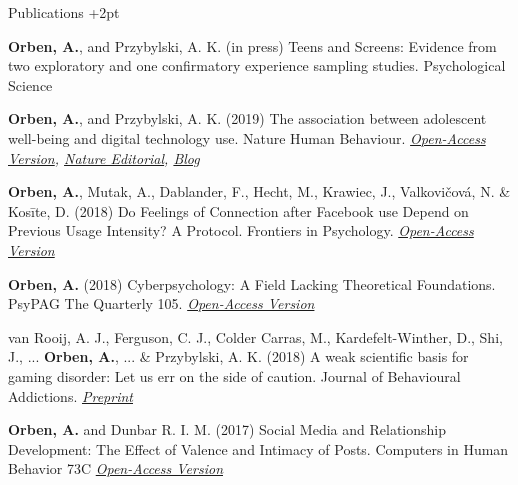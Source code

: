 \documentclass{resume} %
\begin{document}
\begin{rSection}{Publications}  \itemsep +2pt
\item \textbf{Orben, A.}, and Przybylski, A. K. (in press) Teens and Screens: Evidence from two exploratory and one confirmatory experience sampling studies. Psychological Science 

\item \textbf{Orben, A.}, and Przybylski, A. K. (2019) The association between adolescent well-being and digital technology use. Nature Human Behaviour. \textit{{\href{https://www.amyorben.com/pdf/2019_orbenprzybylski_nhb.pdf}{Open-Access Version}}, {\href{https://www.nature.com/articles/d41586-019-00137-6}{Nature Editorial}}, {\href{https://socialsciences.nature.com/users/200472-amy-orben/posts/42763-beyond-cherry-picking}{Blog}}}

\item \textbf{Orben, A.}, Mutak, A., Dablander, F., Hecht, M., Krawiec, J., Valkovičová, N. \& Kosīte, D. (2018) Do Feelings of Connection after Facebook use Depend on Previous Usage Intensity? A Protocol. Frontiers in Psychology. \textit{{\href{https://www.frontiersin.org/articles/10.3389/fpsyg.2018.01163/full}{Open-Access Version}}}

\item \textbf{Orben, A.} (2018) Cyberpsychology: A Field Lacking Theoretical Foundations. PsyPAG The Quarterly 105.  \textit{{\href{http://www.psypag.co.uk/wp-content/uploads/2013/06/PsyPag-107-web.pdf}{Open-Access Version}}}

\item van Rooij, A. J., Ferguson, C. J., Colder Carras, M., Kardefelt-Winther, D., Shi, J., ... \textbf{Orben, A.}, ... \& Przybylski, A. K. (2018) A weak scientific basis for gaming disorder: Let us err on the side of caution. Journal of Behavioural Addictions. \textit{{\href{https://psyarxiv.com/kc7r9/}{Preprint}}}

\item \textbf{Orben, A.} and Dunbar R. I. M. (2017) Social Media and Relationship Development: The Effect of Valence and Intimacy of Posts. Computers in Human Behavior 73C \textit{{\href{https://ora.ox.ac.uk/objects/pubs:687759}{Open-Access Version}}}

\end{rSection}
\end{document}
